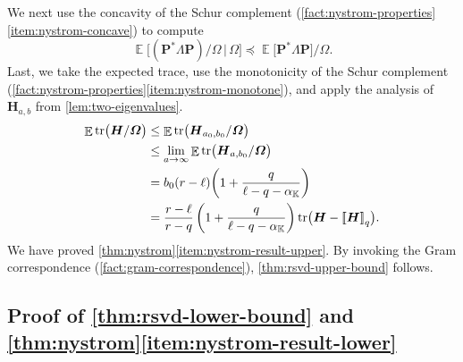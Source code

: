 \documentclass[11pt]{article}
\newcommand{\field}{\mathbb{K}}
\DeclareMathOperator{\tr}{tr}
\newcommand{\mat}[1]{\boldsymbol{#1}}
\newcommand{\lowrank}[1]{%
  \mleft[\!\mleft[ #1 \mright]\!\mright]}
\DeclareMathOperator{\expect}{\mathbb{E}}
\theoremstyle{definition}
\numberwithin{equation}{section}
\begin{document}
We next use the concavity of the Schur complement (\cref{fact:nystrom-properties}\ref{item:nystrom-concave}) to compute
%
\begin{equation*}
    \expect\bigl[(\mat{P}^* \mat{\varLambda} \mat{P})
    / \mat{\varOmega}\,\big|\, \mat{\varOmega}\bigr]
    \preceq
    \expect\bigl[\mat{P}^* \mat{\varLambda} \mat{P}\bigr]
    / \mat{\varOmega}.
\end{equation*}
%
Last, we take the expected trace, use the monotonicity of the Schur complement (\cref{fact:nystrom-properties}\ref{item:nystrom-monotone}), and apply the analysis of $\mat{H}_{a,b}$ from \cref{lem:two-eigenvalues}.
%
\begin{align*}
    \expect \tr\bigl(\mat{H}/\mat{\varOmega}\bigr)
    &\leq \expect \tr\bigl(\mat{H}_{a_0, b_0} / \mat{\varOmega}\bigr) \\
    &\leq \lim_{a \rightarrow \infty} \expect \tr\bigl(\mat{H}_{a, b_0} / \mat{\varOmega}\bigr) \\
    &= b_0(r-\ell) \biggl(1 + \frac{q}{\ell - q - \alpha_\field}\biggr) \\
    &= \frac{r-\ell}{r-q} \left(1 + \frac{q}{\ell-q-\alpha_\field} \right) \tr\bigl(\mat{H} - \lowrank{\mat{H}}_q\bigr).
\end{align*}
We have proved \cref{thm:nystrom}\ref{item:nystrom-result-upper}.
By invoking the Gram correspondence (\cref{fact:gram-correspondence}), \cref{thm:rsvd-upper-bound} follows.

\subsection{Proof of \texorpdfstring{\cref{thm:rsvd-lower-bound}}{Theorem 3.3} and \texorpdfstring{\cref{thm:nystrom}\ref{item:nystrom-result-lower}}{Theorem 3.6(b)}} \label{sec:proof_rsvd_lower}
\end{document}
